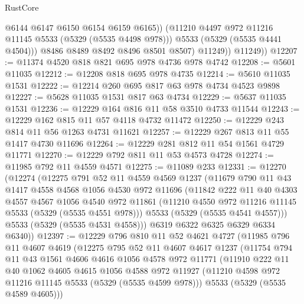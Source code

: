 \begin{lexlean}{RustCore}
\begin{coremodule}
                    @6144
                    @6147
                    @6150
                    @6154
                    @6159
                    @6165))
                (@11210 @4497 @972 @11216 @11145 @5533 (@5329 (@5535 @4498 @978)))
                @5533
                (@5329 (@5535 @4441 @4504)))
              @8486
              @8489
              @8492
              @8496
              @8501
              @8507)
            @11249))
        @11249))
@12207 := @11374 @4520 @818 @821 @695 @978 @4736 @978 @4742
@12208 := @5601 @11035
@12212 := @12208 @818 @695 @978 @4735
@12214 := @5610 @11035 @1531
@12222 := @12214 @260 @695 @817 @63 @978 @4734 @4523 @9898
@12227 := @5628 @11035 @1531 @817 @63 @4734
@12229 := @5637 @11035 @1531
@12236 := @12229 @164 @816 @11 @58 @3510 @4733 @11544
@12243 := @12229 @162 @815 @11 @57 @4118 @4732 @11472
@12250 := @12229 @243 @814 @11 @56 @1263 @4731 @11621
@12257 := @12229 @267 @813 @11 @55 @1417 @4730 @11696
@12264 := @12229 @281 @812 @11 @54 @1561 @4729 @11771
@12270 := @12229 @792 @811 @11 @53 @4573 @4728
@12274 := @11985 @792 @11 @4559 @4571
@12275 := @11089 @233
@12331 := @12270
    (@12274
      (@12275
        @791
        @52
        @11
        @4559
        @4569
        @1237
        (@11679
          @790
          @11
          @43
          @1417
          @4558
          @4568
          @1056
          @4530
          @972
          @11696
          (@11842
            @222
            @11
            @40
            @4303
            @4557
            @4567
            @1056
            @4540
            @972
            @11861
            (@11210 @4550 @972 @11216 @11145 @5533 (@5329 (@5535 @4551 @978)))
            @5533
            (@5329 (@5535 @4541 @4557)))
          @5533
          (@5329 (@5535 @4531 @4558)))
        @6319
        @6322
        @6325
        @6329
        @6334
        @6340))
@12397 := @12229
    @796
    @810
    @11
    @52
    @4621
    @4727
    (@11985
      @796
      @11
      @4607
      @4619
      (@12275
        @795
        @52
        @11
        @4607
        @4617
        @1237
        (@11754
          @794
          @11
          @43
          @1561
          @4606
          @4616
          @1056
          @4578
          @972
          @11771
          (@11910
            @222
            @11
            @40
            @1062
            @4605
            @4615
            @1056
            @4588
            @972
            @11927
            (@11210 @4598 @972 @11216 @11145 @5533 (@5329 (@5535 @4599 @978)))
            @5533
            (@5329 (@5535 @4589 @4605)))

\end{coremodule}
\end{lexlean}
